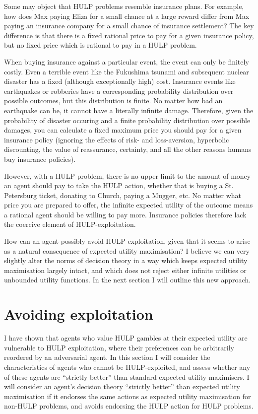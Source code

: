 \documentclass{article}
\begin{document}
Some may object that HULP problems resemble insurance plans. For example, how does Max paying Eliza for a small chance at a large reward differ from Max paying an insurance company for a small chance of insurance settlement? The key difference is that there is a fixed rational price to pay for a given insurance policy, but no fixed price which is rational to pay in a HULP problem.

When buying insurance against a particular event, the event can only be finitely costly. Even a terrible event like the Fukushima tsunami and subsequent nuclear disaster has a fixed (although exceptionally high) cost. Insurance events like earthquakes or robberies have a corresponding probability distribution over possible outcomes, but this distribution is finite. No matter how bad an earthquake can be, it cannot have a literally infinite damage. Therefore, given the probability of disaster occuring and a finite probability distribution over possible damages, you can calculate a fixed maximum price you should pay for a given insurance policy (ignoring the effects of risk- and loss-aversion, hyperbolic discounting, the value of reassurance, certainty, and all the other reasons humans buy insurance policies). 

However, with a HULP problem, there is no upper limit to the amount of money an agent should pay to take the HULP action, whether that is buying a St. Petersburg ticket, donating to Church, paying a Mugger, etc. No matter what price you are prepared to offer, the infinite expected utility of the outcome means a rational agent should be willing to pay more. Insurance policies therefore lack the coercive element of HULP-exploitation.

How can an agent possibly avoid HULP-exploitation, given that it seems to arise as a natural consequence of expected utility maximisation? I believe we can very slightly alter the norms of decision theory in a way which keeps expected utility maximisation largely intact, and which does not reject either infinite utilities or unbounded utility functions. In the next section I will outline this new approach. 

\section{Avoiding exploitation}

I have shown that agents who value HULP gambles at their expected utility are vulnerable to HULP exploitation, where their preferences can be arbitrarily reordered by an adversarial agent. In this section I will consider the characteristics of agents who cannot be HULP-exploited, and assess whether any of these agents are ``strictly better'' than standard expected utility maximisers. I will consider an agent's decision theory ``strictly better'' than expected utility maximisation if it endorses the same actions as expected utility maximisation for non-HULP problems, and avoids endorsing the HULP action for HULP problems.
\end{document}
